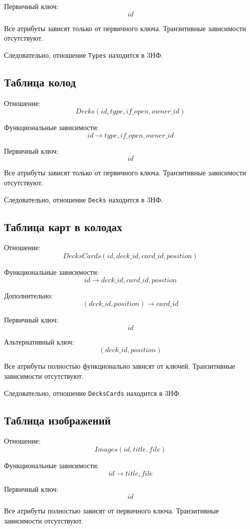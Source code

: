 Первичный ключ:
\[
	id
\]

Все атрибуты зависят только от первичного ключа.
Транзитивные зависимости отсутствуют.

Следовательно, отношение \texttt{Types} находится в 3НФ.

\subsection{Таблица колод}

Отношение:
\[
	Decks(
	id,
	type,
	if\_open,
	owner\_id
	)
\]

Функциональные зависимости:
\[
	id \rightarrow type,
	if\_open,
	owner\_id
\]

Первичный ключ:
\[
	id
\]

Все атрибуты зависят только от первичного ключа.
Транзитивные зависимости отсутствуют.

Следовательно, отношение \texttt{Decks} находится в 3НФ.

\subsection{Таблица карт в колодах}

Отношение:
\[
	DecksCards(
	id,
	deck\_id,
	card\_id,
	position
	)
\]

Функциональные зависимости:
\[
	id \rightarrow deck\_id,
	card\_id,
	position
\]

Дополнительно:
\[
	(deck\_id, position) \rightarrow card\_id
\]

Первичный ключ:
\[
	id
\]

Альтернативный ключ:
\[
	(deck\_id, position)
\]

Все атрибуты полностью функционально зависят от ключей.
Транзитивные зависимости отсутствуют.

Следовательно, отношение \texttt{DecksCards} находится в 3НФ.

\subsection{Таблица изображений}

Отношение:
\[
	Images(
	id,
	title,
	file
	)
\]

Функциональные зависимости:
\[
	id \rightarrow title,
	file
\]

Первичный ключ:
\[
	id
\]

Все атрибуты полностью зависят от первичного ключа.
Транзитивные зависимости отсутствуют.

